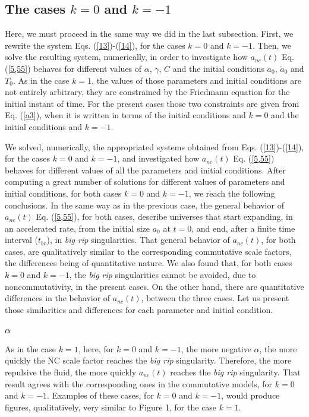 \documentclass[12pt]{article}
\newcommand{\0}{{(0)}}
\newcommand{\1}{{(1)}}
\newcommand{\2}{{(2)}}
\begin{document}
{\subsection{The cases $k = 0$ and $k = -1$}
\label{k=0,-1}

Here, we must proceed in the same way we did in the last subsection. First, we rewrite the system Eqs. (\ref{13})-(\ref{14}), for the cases $k=0$ and $k=-1$.
Then, we solve the resulting system, numerically, in order to investigate how $a_{nc}(t)$ Eq. (\ref{5,55}) behaves for different values of $\alpha$, $\gamma$, 
$C$ and the initial conditions $a_0$, $\dot a_0$ and $T_0$. As in the case $k=1$, the values of those parameters and initial conditions are not entirely arbitrary, 
they are constrained by the Friedmann equation for the initial instant of time. For the present cases those two constraints are given from Eq. (\ref{a3}),
when it is written in terms of the initial conditions and $k=0$ and the initial conditions and $k=-1$.

We solved, numerically, the appropriated systems obtained from Eqs. (\ref{13})-(\ref{14}), for the cases $k=0$ and $k=-1$, and investigated how $a_{nc}(t)$ 
Eq. (\ref{5,55}) behaves for different values of all the parameters and initial conditions. After computing a great number of solutions for different values
of parameters and initial conditions, for both cases $k=0$ and $k=-1$, we reach the following conclusions. In the same way as in the previous case, 
the general behavior of $a_{nc}(t)$ Eq. (\ref{5,55}), for both cases, describe universes that start
expanding, in an accelerated rate, from the initial size $a_0$ at $t=0$, and end, after
a finite time interval ($t_{br}$), in {\it big rip} singularities. That general
behavior of $a_{nc}(t)$, for both cases, are qualitatively similar to the corresponding commutative
scale factors, the differences being of quantitative nature.
We also found that, for both cases $k=0$ and $k=-1$,
the {\it big rip} singularities cannot be avoided, due to noncommutativity, in the present cases.
On the other hand, there are quantitative differences in the behavior of $a_{nc}(t)$, between the three cases. Let us
present those similarities and differences for each parameter and initial condition.

\subsubsection{$\alpha$}
As in the case $k=1$, here, for $k=0$ and $k=-1$, the more negative $\alpha$, the more quickly the NC scale factor reaches the {\it big rip} singularity. Therefore, the more repulsive the fluid, the more quickly $a_{nc}(t)$ reaches the {\it big rip} singularity. That result agrees with the corresponding ones in the commutative models, for $k=0$ and $k=-1$. 
Examples of these cases, for $k=0$ and $k=-1$, would produce figures, qualitatively, very similar to Figure 1, for the case $k=1$.

}
\end{document}
